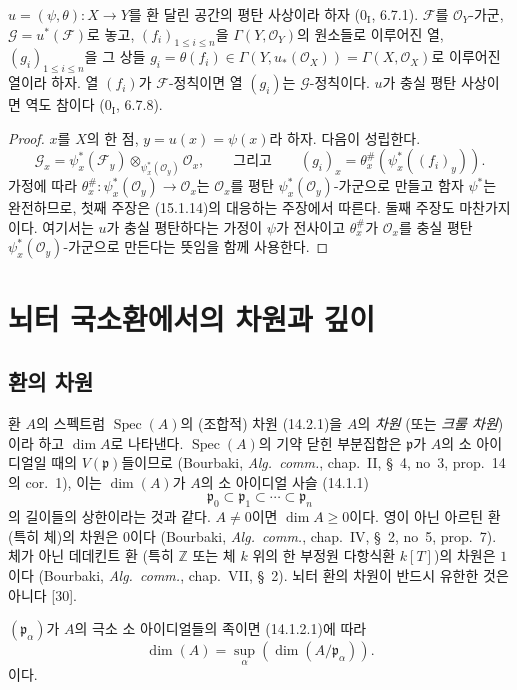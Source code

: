 \begin{proposition}[15.2.5]
\label{0.15.2.5-fr}
$u=(\psi,\theta):X\to Y$를 환 달린 공간의 평탄 사상이라 하자
($0_{\mathrm I}$, 6.7.1). $\mathscr{F}$를
$\mathcal{O}_Y$-가군, $\mathscr{G}=u^*(\mathscr{F})$로 놓고,
$(f_i)_{1\leq i\leq n}$을 $\Gamma(Y,\mathcal{O}_Y)$의 원소들로
이루어진 열, $(g_i)_{1\leq i\leq n}$을 그 상들
$g_i=\theta(f_i)\in\Gamma(Y,u_*(\mathcal{O}_X))
=\Gamma(X,\mathcal{O}_X)$로 이루어진 열이라 하자. 열 $(f_i)$가
$\mathscr{F}$-정칙이면 열 $(g_i)$는
$\mathscr{G}$-정칙이다. $u$가 충실 평탄 사상이면 역도 참이다
($0_{\mathrm I}$, 6.7.8).
\end{proposition}

\begin{proof}
$x$를 $X$의 한 점, $y=u(x)=\psi(x)$라 하자. 다음이 성립한다.
\[
  \mathscr{G}_x=\psi_x^*(\mathscr{F}_y)
  \otimes_{\psi_x^*(\mathcal{O}_y)}\mathcal{O}_x,
  \qquad\text{그리고}\qquad
  (g_i)_x=\theta_x^\#(\psi_x^*((f_i)_y)).
\]
가정에 따라
$\theta_x^\#:\psi_x^*(\mathcal{O}_y)\to\mathcal{O}_x$는
$\mathcal{O}_x$를 평탄 $\psi_x^*(\mathcal{O}_y)$-가군으로 만들고
함자 $\psi^*$는 완전하므로, 첫째 주장은 (15.1.14)의 대응하는
주장에서 따른다. 둘째 주장도 마찬가지이다. 여기서는 $u$가 충실
평탄하다는 가정이 $\psi$가 전사이고 $\theta_x^\#$가
$\mathcal{O}_x$를 충실 평탄 $\psi_x^*(\mathcal{O}_y)$-가군으로
만든다는 뜻임을 함께 사용한다.
\end{proof}

\section{뇌터 국소환에서의 차원과 깊이}
\label{section:0.16-fr}

\subsection{환의 차원}
\label{subsection:0.16.1-fr}

\begin{env}[16.1.1]
\label{0.16.1.1-fr}
환 $A$의 스펙트럼 $\operatorname{Spec}(A)$의 (조합적) 차원
(14.2.1)을 $A$의 \emph{차원} (또는 \emph{크룰 차원})이라 하고
$\dim A$로 나타낸다. $\operatorname{Spec}(A)$의 기약 닫힌
부분집합은 $\mathfrak{p}$가 $A$의 소 아이디얼일 때의
$V(\mathfrak{p})$들이므로 (Bourbaki, \emph{Alg.~comm.}, chap.~II,
\S~4, no~3, prop.~14의 cor.~1), 이는 $\dim(A)$가 $A$의 소
아이디얼 사슬 (14.1.1)
\[
  \mathfrak{p}_0\subset\mathfrak{p}_1\subset\cdots\subset\mathfrak{p}_n
\]
의 길이들의 상한이라는 것과 같다. $A\neq0$이면 $\dim A\geq0$이다.
영이 아닌 아르틴 환 (특히 체)의 차원은 $0$이다 (Bourbaki,
\emph{Alg.~comm.}, chap.~IV, \S~2, no~5, prop.~7). 체가 아닌
데데킨트 환 (특히 $\mathbb{Z}$ 또는 체 $k$ 위의 한 부정원 다항식환
$k[T]$)의 차원은 $1$이다 (Bourbaki, \emph{Alg.~comm.}, chap.~VII,
\S~2). 뇌터 환의 차원이 반드시 유한한 것은 아니다 [30].

$(\mathfrak{p}_\alpha)$가 $A$의 극소 소 아이디얼들의 족이면
(14.1.2.1)에 따라
\[
\label{0.16.1.1.1-fr}
  \dim(A)=\sup_\alpha(\dim(A/\mathfrak{p}_\alpha)).
\tag{16.1.1.1}
\]
이다.
\end{env}

